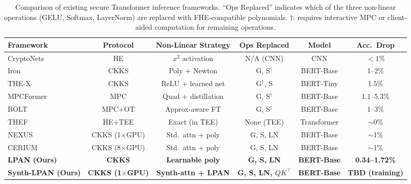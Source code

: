 \begin{table}[ht]
\centering
\caption{Comparison of existing secure Transformer inference frameworks. ``Ops Replaced'' indicates which of the three non-linear operations (GELU, Softmax, LayerNorm) are replaced with FHE-compatible polynomials. $\dagger$: requires interactive MPC or client-aided computation for remaining operations.}
\label{tab:framework_comparison}
\begin{tabular}{|l|c|c|c|c|c|}
\hline
\textbf{Framework} & \textbf{Protocol} & \textbf{Non-Linear Strategy} & \textbf{Ops Replaced} & \textbf{Model} & \textbf{Acc.\ Drop} \\ \hline
CryptoNets~\cite{gilad2016cryptonets} & HE & $x^2$ activation & N/A (CNN) & CNN & $<1\%$ \\ \hline
Iron~\cite{hao2022iron} & CKKS & Poly + Newton & G, S$^\dagger$ & BERT-Base & 1--2\% \\ \hline
THE-X~\cite{chen2022thex} & CKKS & ReLU + learned net & G$^\dagger$, S & BERT-Tiny & 1.5\% \\ \hline
MPCFormer~\cite{li2023mpcformer} & MPC & Quad + distillation & G, S$^\dagger$ & BERT-Base & 1.1--5.3\% \\ \hline
BOLT~\cite{pang2024bolt} & MPC+OT & Approx-aware FT & G, S$^\dagger$ & BERT-Base & 1--3\% \\ \hline
THEF~\cite{li2024thef} & HE+TEE & Exact (in TEE) & None (TEE) & Transformer & $\sim$0\% \\ \hline
NEXUS~\cite{zhang2024nexus} & CKKS (1$\times$GPU) & Std.\ attn + poly & G, S, LN & BERT-Base & $\sim$1\% \\ \hline
CERIUM~\cite{cerium2025} & CKKS (8$\times$GPU) & Std.\ attn + poly & G, S, LN & BERT-Base & $\sim$1\% \\ \hline
\textbf{LPAN (Ours)} & \textbf{CKKS} & \textbf{Learnable poly} & \textbf{G, S, LN} & \textbf{BERT-Base} & \textbf{0.34--1.72\%} \\ \hline
\textbf{Synth-LPAN (Ours)} & \textbf{CKKS (1$\times$GPU)} & \textbf{Synth-attn + LPAN} & \textbf{G, S, LN, $Q\!K^\top$} & \textbf{BERT-Base} & \textbf{TBD (training)} \\ \hline
\end{tabular}
\end{table}